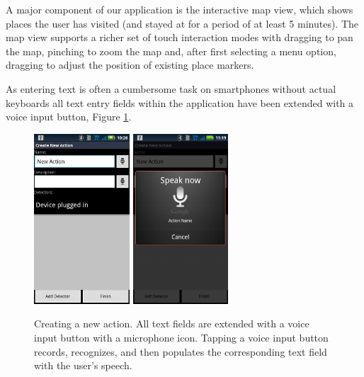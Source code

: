 \documentclass{acm_proc_article-sp}
\begin{document}
A major component of our application is the interactive map view, which shows places the user has visited (and stayed at for a period of at least 5 minutes). The map view supports a richer set of touch interaction modes with dragging to pan the map, pinching to zoom the map and, after first selecting a menu option, dragging to adjust the position of existing place markers.

As entering text is often a cumbersome task on smartphones without actual keyboards all text entry fields within the application have been extended with a voice input button, Figure \ref{figure:voice}.

\begin{figure}
\begin{center}
\includegraphics[height=2.5in]{voiceinput}
\includegraphics[height=2.5in]{voiceinput2}
\caption{
Creating a new action. All text fields are extended with a voice input button with a microphone icon. Tapping a voice input button records, recognizes, and then populates the corresponding text field with the user's speech. 
}
\label{figure:voice}
\end{center}
\end{figure}
\end{document}
